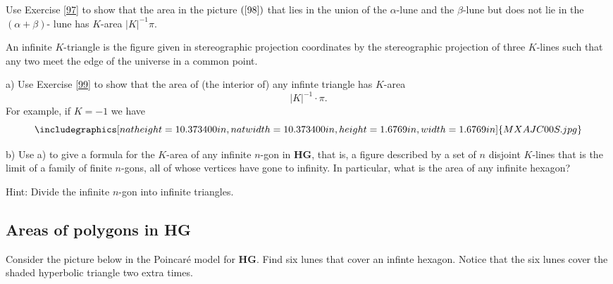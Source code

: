 \documentclass{ximera}
\begin{document}
\begin{exercise}
 Use Exercise \ref{97} to show that the area in the picture
$\left(  \ref{98}\right)  $ that lies in the union of the $\alpha$-lune and
the $\beta$-lune but does not lie in the $\left(  \alpha+\beta\right)  $- lune
has $K$-area $\left\vert K\right\vert ^{-1}\pi$.
\end{exercise}

\begin{definition}
 An infinite $K$-triangle is the figure given in stereographic
projection coordinates by the stereographic projection of three $K$-lines such
that any two meet the edge of the universe in a common point.
\end{definition}

\begin{exercise}
a)  Use Exercise \ref{99} to show that the area of (the interior
of) any infinte triangle has $K$-area%
\[
\left\vert K\right\vert ^{-1}\cdot\pi.
\]
For example, if $K=-1$ we have%
\[%
{\includegraphics[
natheight=10.373400in,
natwidth=10.373400in,
height=1.6769in,
width=1.6769in
]%
{MXAJC00S.jpg}%
}%
\]


b) Use a) to give a formula for the $K$-area of any infinite $n$-gon in
\textbf{HG}, that is, a figure described by a set of $n$ disjoint $K$-lines
that is the limit of a family of finite $n$-gons, all of whose vertices have
gone to infinity. In particular, what is the area of any infinite hexagon?

Hint: Divide the infinite $n$-gon into infinite triangles.
\end{exercise}

\subsection*{Areas of polygons in \textbf{HG}}

Consider the picture below in the Poincar\'{e} model for \textbf{HG}. Find six
lunes that cover an infinte hexagon. Notice that the six lunes cover the
shaded hyperbolic triangle two extra times.%
\end{document}
